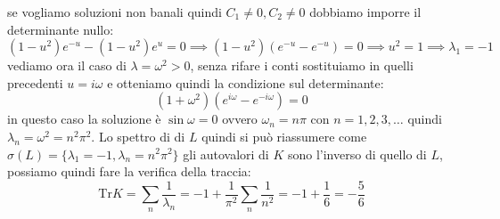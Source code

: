 se vogliamo soluzioni non banali quindi $C_1 \neq 0,C_2\neq 0$ dobbiamo imporre il determinante nullo:
\[(1-u^2)e^{-u} - (1-u^2)e^u = 0 \implies (1-u^2)(e^{-u}-e^{-u})= 0 \implies u^2=1 \implies \lambda_1 = -1 \]
vediamo ora il caso di $\lambda = \omega^2 >0$, senza rifare i conti sostituiamo in quelli precedenti $u = i\omega$ e otteniamo quindi la condizione sul determinante:
\[(1+\omega^2)(e^{i\omega} - e^{-i\omega})=0\]
in questo caso la soluzione è $\sin\omega = 0$ ovvero $\omega_n = n\pi$ con $n=1,2,3,\dots$ quindi $\lambda_n = \omega^2 = n^2\pi^2$. Lo spettro di di $L$ quindi si può riassumere come $\sigma(L) = \{\lambda_1 = -1,\lambda_n =n^2\pi^2 \}$ gli autovalori di $K$ sono l'inverso di quello di $L$, possiamo quindi fare la verifica della traccia:
\[\text{Tr}K = \sum_n \frac{1}{\lambda_n} = -1 + \frac{1}{\pi^2}\sum_n\frac{1}{n^2} = -1 + \frac{1}{6} =  -\frac{5}{6}\]